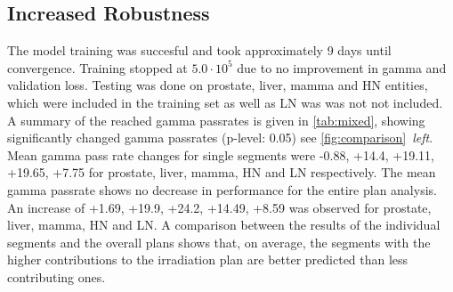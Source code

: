 \subsection{Increased Robustness}

The model training was succesful and took approximately 9 days until convergence. Training stopped at $5.0\cdot10^5$ due to no improvement in gamma and validation loss. 
Testing was done on prostate, liver, mamma and \acs{HN} entities, which were included in the training set as well as \acs{LN} was was not not included. 
A summary of the reached gamma passrates is given in \autoref{tab:mixed}, showing significantly changed gamma passrates (p-level: 0.05) see \autoref{fig:comparison}~\emph{left}.
Mean gamma pass rate changes for single segments were -0.88, +14.4, +19.11, +19.65, +7.75 for prostate, liver, mamma, \acs{HN} and \acs{LN} respectively. 
The mean gamma passrate shows no decrease in performance for the entire plan analysis. An increase of +1.69, +19.9, +24.2, +14.49, +8.59 was observed for prostate, liver, mamma, \acs{HN} and \acs{LN}. 
A comparison between the results of the individual segments and the overall plans shows that, on average, the segments with the higher contributions to the irradiation plan are better predicted than less contributing ones. 

